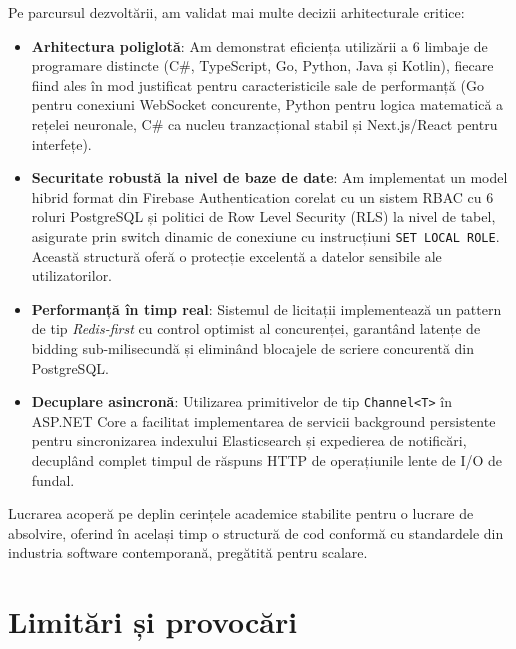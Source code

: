 Pe parcursul dezvoltării, am validat mai multe decizii arhitecturale critice:
\begin{itemize}
    \item \textbf{Arhitectura poliglotă}: Am demonstrat eficiența utilizării a 6 limbaje de programare distincte (C\#, TypeScript, Go, Python, Java și Kotlin), fiecare fiind ales în mod justificat pentru caracteristicile sale de performanță (Go pentru conexiuni WebSocket concurente, Python pentru logica matematică a rețelei neuronale, C\# ca nucleu tranzacțional stabil și Next.js/React pentru interfețe).
    \item \textbf{Securitate robustă la nivel de baze de date}: Am implementat un model hibrid format din Firebase Authentication corelat cu un sistem RBAC cu 6 roluri PostgreSQL și politici de Row Level Security (RLS) la nivel de tabel, asigurate prin switch dinamic de conexiune cu instrucțiuni \texttt{SET LOCAL ROLE}. Această structură oferă o protecție excelentă a datelor sensibile ale utilizatorilor.
    \item \textbf{Performanță în timp real}: Sistemul de licitații implementează un pattern de tip \textit{Redis-first} cu control optimist al concurenței, garantând latențe de bidding sub-milisecundă și eliminând blocajele de scriere concurentă din PostgreSQL.
    \item \textbf{Decuplare asincronă}: Utilizarea primitivelor de tip \texttt{Channel<T>} în ASP.NET Core a facilitat implementarea de servicii background persistente pentru sincronizarea indexului Elasticsearch și expedierea de notificări, decuplând complet timpul de răspuns HTTP de operațiunile lente de I/O de fundal.
\end{itemize}

Lucrarea acoperă pe deplin cerințele academice stabilite pentru o lucrare de absolvire, oferind în același timp o structură de cod conformă cu standardele din industria software contemporană, pregătită pentru scalare.

\section{Limitări și provocări}

